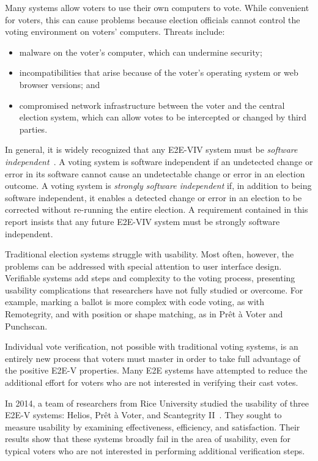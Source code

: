 Many systems allow voters to use their own computers to vote. While
convenient for voters, this can cause problems because election
officials cannot control the voting environment on voters'
computers. Threats include:
\begin{itemize}
\item malware on the voter's computer, which can undermine security;
\item incompatibilities that arise because of the voter's operating
  system or web browser versions; and
\item compromised network infrastructure between the voter and the
  central election system, which can allow votes to be intercepted or
  changed by third parties.
\end{itemize}

In general, it is widely recognized that any E2E-VIV system must be
\emph{software independent}~\cite{RivestWack}.  A voting system is
software independent if an undetected change or error in its software
cannot cause an undetectable change or error in an election outcome. A
voting system is \emph{strongly software independent} if, in addition
to being software independent, it enables a detected change or error
in an election to be corrected without re-running the entire election.
A requirement contained in this report insists that any future E2E-VIV
system must be strongly software independent.


Traditional election systems struggle with usability. Most often,
however, the problems can be addressed with special attention to user
interface design. Verifiable systems add steps and complexity to the
voting process, presenting usability complications that researchers
have not fully studied or overcome. For example, marking a ballot is
more complex with code voting, as with Remotegrity, and with position
or shape matching, as in Prêt à Voter and Punchscan. 

Individual vote verification, not possible with traditional voting
systems, is an entirely new process that voters must master in order
to take full advantage of the positive E2E-V properties. Many E2E
systems have attempted to reduce the additional effort for voters who
are not interested in verifying their cast votes.

In 2014, a team of researchers from Rice University studied the
usability of three E2E-V systems: Helios, Prêt à Voter, and
Scantegrity II~\cite{acemyan2014usability}. They sought to measure
usability by examining effectiveness, efficiency, and
satisfaction. Their results show that these systems broadly fail in
the area of usability, even for typical voters who are not interested
in performing additional verification steps.

